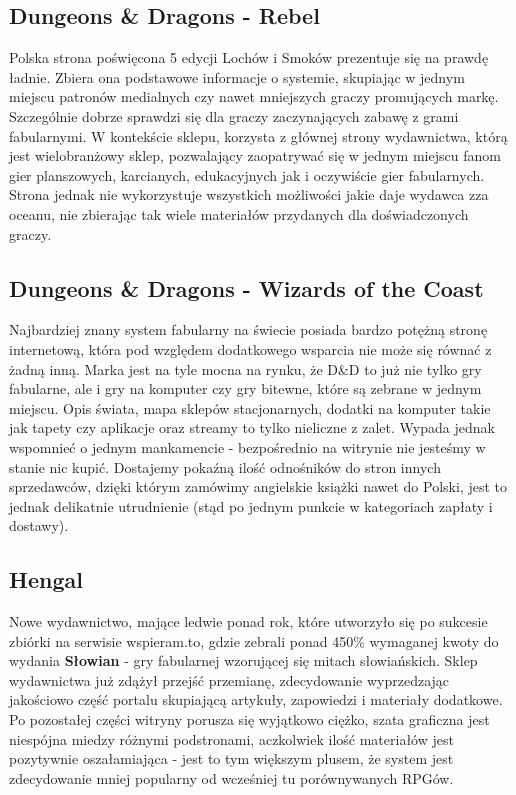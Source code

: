 \documentclass[a4paper,11pt]{article}
\begin{document}
\subsection {Dungeons \& Dragons - Rebel}

Polska strona poświęcona 5 edycji Lochów i Smoków prezentuje się na prawdę ładnie. Zbiera ona podstawowe informacje o systemie, skupiając w jednym miejscu patronów medialnych czy nawet mniejszych graczy promujących markę. Szczególnie dobrze sprawdzi się dla graczy zaczynających zabawę z grami fabularnymi. W kontekście sklepu, korzysta z głównej strony wydawnictwa, którą jest wielobranżowy sklep, pozwalający zaopatrywać się w jednym miejscu fanom gier planszowych, karcianych, edukacyjnych jak i oczywiście gier fabularnych. Strona jednak nie wykorzystuje wszystkich możliwości jakie daje wydawca zza oceanu, nie zbierając tak wiele materiałów przydanych dla doświadczonych graczy.

\subsection {Dungeons \& Dragons - Wizards of the Coast}

Najbardziej znany system fabularny na świecie posiada bardzo potężną stronę internetową, która pod względem dodatkowego wsparcia nie może się równać z żadną inną. Marka jest na tyle mocna na rynku, że D\&D to już nie tylko gry fabularne, ale i gry na komputer czy gry bitewne, które są zebrane w jednym miejscu. Opis świata, mapa sklepów stacjonarnych, dodatki na komputer takie jak tapety czy aplikacje oraz streamy to tylko nieliczne z zalet. Wypada jednak wspomnieć o jednym mankamencie - bezpośrednio na witrynie nie jesteśmy w stanie nic kupić. Dostajemy pokaźną ilość odnośników do stron innych sprzedawców, dzięki którym zamówimy angielskie książki nawet do Polski, jest to jednak delikatnie utrudnienie (stąd po jednym punkcie w kategoriach zapłaty i dostawy).

\subsection {Hengal}

Nowe wydawnictwo, mające ledwie ponad rok, które utworzyło się po sukcesie zbiórki na serwisie wspieram.to, gdzie zebrali ponad 450\% wymaganej kwoty do wydania \textbf{Słowian} - gry fabularnej wzorującej się mitach słowiańskich. Sklep wydawnictwa już zdążył przejść przemianę, zdecydowanie wyprzedzając jakościowo część portalu skupiającą artykuły, zapowiedzi i materiały dodatkowe. Po pozostałej części witryny porusza się wyjątkowo ciężko, szata graficzna jest niespójna miedzy różnymi podstronami, aczkolwiek ilość materiałów jest pozytywnie oszałamiająca - jest to tym większym plusem, że system jest zdecydowanie mniej popularny od wcześniej tu porównywanych RPGów.
\end{document}
